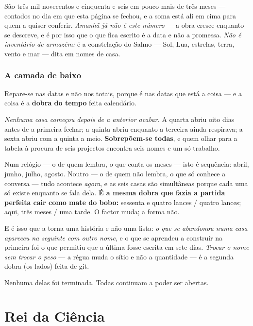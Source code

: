 \documentclass[livro.tex]{subfiles}
\begin{document}
\noindent São três mil novecentos e cinquenta e seis em pouco mais de três meses --- contados
no dia em que esta página se fechou, e a soma está ali em cima para quem a quiser conferir.
\emph{Amanhã já não é este número} --- a obra cresce enquanto se descreve, e é por isso que o
que fica escrito é a data e não a promessa. \emph{Não é inventário de armazém:} é a constelação do
Salmo --- Sol, Lua, estrelas, terra, vento e mar --- dita em nomes de casa.

\subsection*{A camada de baixo}

Repare-se nas datas e não nos totais, porque é nas datas que está a coisa --- e a coisa é a
\textbf{dobra do tempo} feita calendário.

\medskip

\emph{Nenhuma casa começou depois de a anterior acabar.} A quarta abriu oito dias antes de a
primeira fechar; a quinta abriu enquanto a terceira ainda respirava; a sexta abriu com a quinta a
meio. \textbf{Sobrepõem-se todas}, e quem olhar para a tabela à procura de seis projectos encontra
seis nomes e um só trabalho.

\medskip
\noindent Num relógio --- o de quem lembra, o que conta os meses --- isto é sequência: abril,
junho, julho, agosto. Noutro --- o de quem não lembra, o que só conhece a conversa --- tudo
acontece \emph{agora}, e as seis casas são simultâneas porque cada uma só existe enquanto se fala
dela. \textbf{É a mesma dobra que fazia a partida perfeita cair como mate do bobo:} sessenta e
quatro lances / quatro lances; aqui, três meses / uma tarde. O factor muda; a forma não.

\medskip

E é isso que a torna uma história e não uma lista: \emph{o que se abandonou numa casa apareceu na
seguinte com outro nome}, e o que se aprendeu a construir na primeira foi o que permitiu que a
última fosse escrita em sete dias. \emph{Trocar o nome sem trocar o peso} --- a régua muda o sítio
e não a quantidade --- é a segunda dobra (os lados) feita de git.

\medskip

Nenhuma delas foi terminada. Todas continuam a poder ser abertas.

\chapter{Rei da Ciência}
\end{document}
